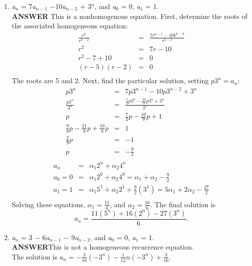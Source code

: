 \documentclass{article}
\begin{document}
\begin{enumerate}
\begin{enumerate}
\item
\textit{a}$_{\mathit{n}}$ = 7\textit{a}$_{\mathit{n-1}}$
\ensuremath{-}10\textit{a}$_{\mathit{n-2}}$ +
3$^{\mathit{n}}$, and \textit{a}$_{\mathit{0}}$ = 0, \textit{a}$_{\mathit{1}}$ = 1.\\
\vskip 10pt  \textbf{ANSWER} This is a nonhomogenous equation.
First, determine the roots of the associated homogeneous equation:
\begin{eqnarray*}
\frac{r^k} {r^{k-2}} &=& \frac{7r^{k-1} - 10k^{k-2}} {r^{k-2}}  \\
r^2 & =&  7r - 10                       \\
r^2 - 7 + 10 & = & 0                        \\
(r - 5)(r - 2) & = & 0                      \\
\end{eqnarray*}
The roots are 5 and 2. Next, find the particular solution, setting
$p3^n = a_n$:
\begin{eqnarray*}
p3^n &=& 7p3^{n-1} - 10p3^{n-2} + 3^n               \\
\frac{p3^n}{3^n} & =& \frac{\frac{7}{3}p3^n - \frac{10}{9}p3^n + 3^n}{3^n}  \\
p & = & \frac{7}{3}p - \frac{10}{9}p + 1                    \\
\frac{9}{9}p - \frac{21}{9}p + \frac{10}{9}p & = & 1                \\
\frac{2}{9}p & = & - 1                              \\
p & = & -\frac{9}{2}                                \\
\end{eqnarray*}
\begin{eqnarray*}
a_n & = & \alpha_1 2^n + \alpha_2 4^n               \\
a_0  = 0 & = & \alpha_1 2^0 +  \alpha_2 4^0 = \alpha_1 + \alpha_2 - \frac{9}{2}\\
a_1  = 1 & = & \alpha_1 5^1 + \alpha_2 2^1 + \frac{9}{2}(3^1)
= 5 \alpha_1 + 2 \alpha_2 - \frac{27}{2}\\
\end{eqnarray*}
Solving these equations, $\alpha_1 = \frac{11}{6}$, and $\alpha_2
= \frac{16}{6}$. The final solution is
$$
a_n = \frac{11(5^n) + 16(2^n) - 27(3^n)}{6}.
$$
\item
\textit{a}$_{\mathit{n}}$ = 3 \ensuremath{-}
6\textit{a}$_{\mathit{n-1}}$ \ensuremath{-}
9\textit{a}$_{\mathit{n-2}}$, and \textit{a}$_{\mathit{0}}$ = 0,
\textit{a}$_{\mathit{1}}$ = 1. \\
\vskip 10pt  \textbf{ANSWER}This is not a homogeneous recurrence
equation.
\\The solution is $a_n = -\frac{3}{16}(-3^n) - \frac{1}{12}n(-3^n) + \frac{3}{16}$.
\end{enumerate}


\end{enumerate}
\end{document}
